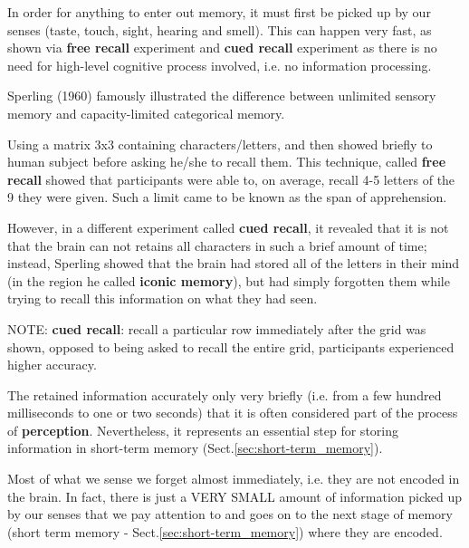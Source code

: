 In order for anything to enter out memory, it
must first be picked up by our senses (taste, touch, sight, hearing and smell).
This can happen very fast, as shown via {\bf free recall} experiment and {\bf
cued recall} experiment as there is no need for high-level cognitive process
involved, i.e. no information processing. 
\begin{mdframed}
Sperling (1960) famously illustrated the difference between unlimited sensory
memory and capacity-limited categorical memory.

Using a matrix 3x3 containing characters/letters, and then showed briefly to
human subject before asking he/she to recall them. This technique, called
{\bf free recall} showed that participants were able to, on average, recall 4-5
letters of the 9 they were given. Such a limit came to be known as the span of
apprehension. 

However, in a different experiment called {\bf cued recall}, it revealed that it
is not that the brain can not retains all characters in such a brief amount of time; instead,
Sperling showed that the brain had stored all of the letters in their mind
(in the region he called {\bf iconic memory}), but had simply forgotten them
while trying to recall this information on what they had seen. 

NOTE: {\bf cued recall}: recall a particular row immediately after the grid was
shown, opposed to being asked to recall the entire grid, participants
experienced higher accuracy.


\end{mdframed}

The retained information accurately only very briefly (i.e. from a few hundred
milliseconds to one or two seconds) that it is often considered part of the
process of {\bf perception}. Nevertheless, it represents an essential step for
storing information in short-term memory (Sect.\ref{sec:short-term_memory}).

Most of what we sense we forget almost immediately, i.e. they are not encoded in
the brain. In fact, there is just a VERY SMALL amount of information picked up
by our senses that we pay attention to and goes on to the next stage of memory
(short term memory - Sect.\ref{sec:short-term_memory}) where they are encoded.
 
